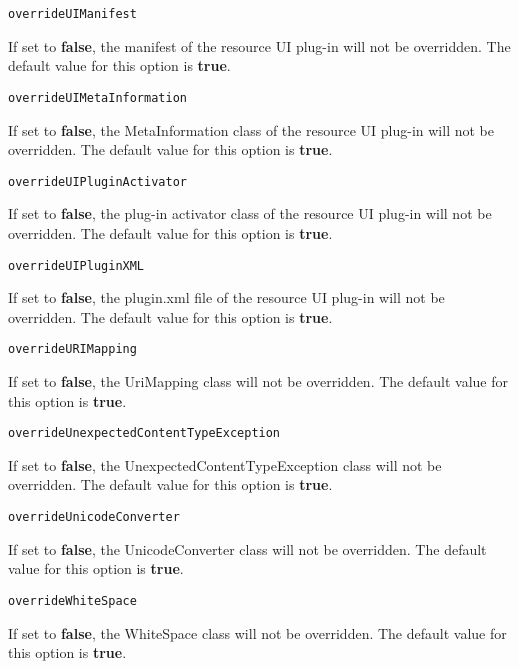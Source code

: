 \noindent\texttt{overrideUIManifest}
\begin{myindentpar}{1cm}
If set to \textbf{false}, the manifest of the resource UI plug-in will not be overridden. The default value for this option is \textbf{true}.
\end{myindentpar}

\noindent\texttt{overrideUIMetaInformation}
\begin{myindentpar}{1cm}
If set to \textbf{false}, the MetaInformation class of the resource UI plug-in will not be overridden. The default value for this option is \textbf{true}.
\end{myindentpar}

\noindent\texttt{overrideUIPluginActivator}
\begin{myindentpar}{1cm}
If set to \textbf{false}, the plug-in activator class of the resource UI plug-in will not be overridden. The default value for this option is \textbf{true}.
\end{myindentpar}

\noindent\texttt{overrideUIPluginXML}
\begin{myindentpar}{1cm}
If set to \textbf{false}, the plugin.xml file of the resource UI plug-in will not be overridden. The default value for this option is \textbf{true}.
\end{myindentpar}

\noindent\texttt{overrideURIMapping}
\begin{myindentpar}{1cm}
If set to \textbf{false}, the UriMapping class will not be overridden. The default value for this option is \textbf{true}.
\end{myindentpar}

\noindent\texttt{overrideUnexpectedContentTypeException}
\begin{myindentpar}{1cm}
If set to \textbf{false}, the UnexpectedContentTypeException class will not be overridden. The default value for this option is \textbf{true}.
\end{myindentpar}

\noindent\texttt{overrideUnicodeConverter}
\begin{myindentpar}{1cm}
If set to \textbf{false}, the UnicodeConverter class will not be overridden. The default value for this option is \textbf{true}.
\end{myindentpar}

\noindent\texttt{overrideWhiteSpace}
\begin{myindentpar}{1cm}
If set to \textbf{false}, the WhiteSpace class will not be overridden. The default value for this option is \textbf{true}.
\end{myindentpar}

